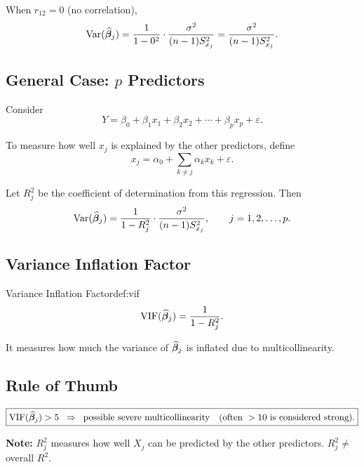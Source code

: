 When $r_{12} = 0$ (no correlation),
\[
\operatorname{Var}(\widehat{\boldsymbol{\beta}}_j)
= \frac{1}{1 - 0^2}\cdot \frac{\sigma^2}{(n-1)S_{x_j}^2}
= \frac{\sigma^2}{(n-1)S_{x_j}^2}.
\]

\subsection{General Case: $p$ Predictors}

Consider
\[
Y = \beta_0 + \beta_1 x_1 + \beta_2 x_2 + \cdots + \beta_p x_p + \varepsilon.
\]

To measure how well $x_j$ is explained by the other predictors, define
\[
x_j = \alpha_0 + \sum_{k \ne j} \alpha_k x_k + \varepsilon.
\]

Let $R_j^2$ be the coefficient of determination from this regression. Then
\[
\operatorname{Var}(\widehat{\boldsymbol{\beta}}_j)
= \frac{1}{1 - R_j^2}\cdot \frac{\sigma^2}{(n-1)S_{x_j}^2},
\qquad j = 1,2,\dots,p.
\]

\subsection{Variance Inflation Factor}

\begin{defn}{Variance Inflation Factor}{def:vif}
\[
\mathrm{VIF}(\widehat{\boldsymbol{\beta}}_j) = \frac{1}{1 - R_j^2}.
\]

It measures how much the variance of $\widehat{\boldsymbol{\beta}}_j$ is inflated due to multicollinearity.
\end{defn}

\subsection{Rule of Thumb}

\begin{caution}
\[\boxed{
\mathrm{VIF}(\widehat{\boldsymbol{\beta}}_j) > 5 \;\;\Rightarrow\;\; \text{possible severe multicollinearity}
\quad (\text{often } >10 \text{ is considered strong}).}
\]
\end{caution}

\begin{notebox}
\textbf{Note:} $R_j^2$ measures how well $X_j$ can be predicted by the other predictors. $R_j^2 \neq$ overall $R^2$.
\end{notebox}

\clearpage

